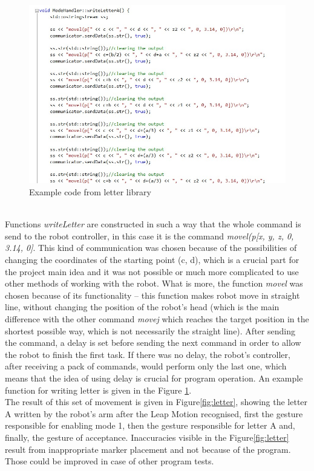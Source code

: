 \begin{figure}[H]
	\includegraphics[scale=0.8]{Aletter}
	\centering
	\caption{Example code from letter library}
	\label{fig:Aletter}
\end{figure}

\mbox{}\\
Functions \textit{writeLetter} are constructed in such a way that the whole command is send to the robot controller, in this case it is the command \textit{movel(p[x, y, z, 0, 3.14, 0]}. This kind of communication was chosen because of the possibilities of changing the coordinates of the starting point (c, d), which is a crucial part for the project main idea and it was not possible or much more complicated to use other methods of working with the robot. What is more, the function \textit{movel} was chosen because of its functionality – this function makes robot move in straight line, without changing the position of the robot’s head (which is the main difference with the other command \textit{movej} which reaches the target position in the shortest possible way, which is not necessarily the straight line). After sending the command, a delay is set before sending the next command in order to allow the robot to finish the first task. If there was no delay, the robot’s controller, after receiving a pack of commands, would perform only the last one, which means that the idea of using delay is crucial for program operation. An example function for writing letter is given in the Figure \ref{fig:Aletter}. \\


The result of this set of movement is given in Figure\ref{fig:letter}, showing the letter A written by the robot’s arm after the Leap Motion recognised, first the gesture responsible for enabling mode 1, then the gesture responsible for letter A and, finally, the gesture of acceptance. Inaccuracies visible in the Figure\ref{fig:letter} result from inappropriate marker placement and not because of the program. Those could be improved in case of other program tests. \\

